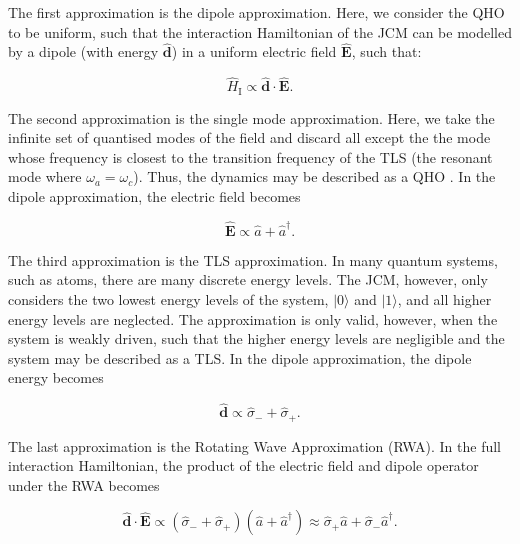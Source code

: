 \documentclass[11pt]{article}
\begin{document}
The first approximation is the dipole approximation. Here, we consider the QHO to be uniform, such that the interaction Hamiltonian of the JCM can be modelled by a dipole (with energy $\boldsymbol{\hat{d}}$) in a uniform electric field $\boldsymbol{\hat{E}}$, such that:

\begin{equation*}
    \hat{H}_{\scriptscriptstyle \text{I}} \propto \boldsymbol{\hat{d}} \cdot \boldsymbol{\hat{E}}.
\end{equation*}

The second approximation is the single mode approximation. Here, we take the infinite set of quantised modes of the field and discard all except the the mode whose frequency is closest to the transition frequency of the TLS (the resonant mode where $\omega_a = \omega_c$). Thus, the dynamics may be described as a QHO \cite{General2024-JCM_relevance}. In the dipole approximation, the electric field becomes

\begin{equation*}
    \boldsymbol{\hat{E}}  \propto \hat{a} + \hat{a}^\dagger.
\end{equation*}


The third approximation is the TLS approximation. In many quantum systems, such as atoms, there are many discrete energy levels. The JCM, however, only considers the two lowest energy levels of the system, $|0\rangle$ and $|1\rangle$, and all higher energy levels are neglected. The approximation is only valid, however, when the system is weakly driven, such that the higher energy levels are negligible and the system may be described as a TLS. In the dipole approximation, the dipole energy becomes

\begin{equation*}
    \boldsymbol{\hat{d}}  \propto \hat{\sigma}_{-} + \hat{\sigma}_{+}.
\end{equation*}

The last approximation is the Rotating Wave Approximation (RWA). In the full interaction Hamiltonian, the product of the electric field and dipole operator under the RWA becomes

\begin{equation}
    \boldsymbol{\hat{d}} \cdot \boldsymbol{\hat{E}} \propto (\hat{\sigma}_{-} + \hat{\sigma}_{+})(\hat{a} + \hat{a}^\dagger) \approx \hat{\sigma}_{+}\hat{a} +\hat{\sigma}_{-}\hat{a}^\dagger. 
\end{equation}
\end{document}
